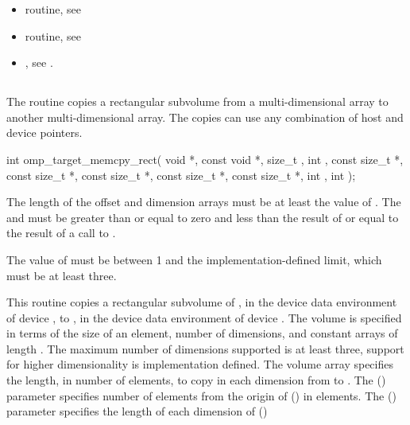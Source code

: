 \begin{ccppspecific}
\begin{itemize}
\item {} routine, see 

\item {} routine, see 


\item {}, see 
.
\end{itemize}


\vspace{-1\baselineskip}
\subsection{}
\label{subsec:omp_target_memcpy_rect}
\summary

The  routine copies a rectangular subvolume from
a multi-dimensional array to another multi-dimensional array. The copies can
use any combination of host and device pointers.

\format
\begin{samepage}
\begin{ompcFunction}
int omp_target_memcpy_rect(
  void *,
  const void *,
  size_t ,
  int ,
  const size_t *,
  const size_t *,
  const size_t *,
  const size_t *,
  const size_t *,
  int ,
  int 
);
\end{ompcFunction}
\end{samepage}

\constraints
The length of the offset and dimension arrays must be at least the
value of .
The  and 
must be greater than or equal to zero and less than the result of
 or equal to the result of a call to
.

The value of  must be between 1 and the implementation-defined
limit, which must be at least three.


\effect

This routine copies a rectangular subvolume of ,
in the device data environment of device ,
to , in the device data environment of device .
The volume is specified in terms of the size of an element, 
number of dimensions, and constant arrays of length .  The 
maximum number of dimensions supported is at least three, support for higher 
dimensionality is implementation defined. The volume array specifies the 
length, in number of elements, to copy in each dimension from  
to . The  () parameter specifies
number of elements from the origin of  () in elements.  
The  () parameter specifies the 
length of each dimension of  ()


\end{ccppspecific}
